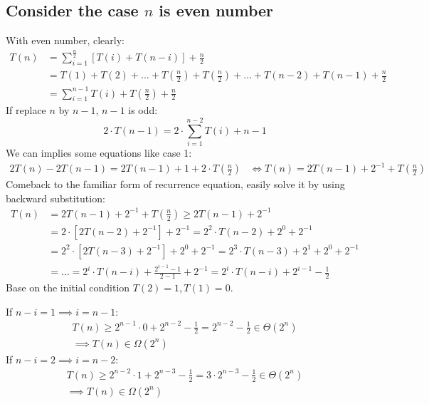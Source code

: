 \documentclass[a4paper]{article}
\begin{document}
\subsection{Consider the case $n$ is even number}
With even number, clearly:
\begin{equation*}
    \begin{aligned}
        T(n) &= \sum_{i=1}^{\frac{n}{2}}[T(i)+T(n-i)] + \frac{n}{2} \\
        &= T(1)+T(2)+\ldots+T(\frac{n}{2})+T(\frac{n}{2})+\ldots+T(n-2)+T(n-1) + \frac{n}{2} \\ 
        &= \sum_{i=1}^{n-1}T(i) + T(\frac{n}{2}) + \frac{n}{2} 
    \end{aligned}
\end{equation*}
If replace $n$ by $n-1$, $n-1$ is odd:
\begin{equation*}
    2 \cdot T(n-1) = 2 \cdot \sum_{i=1}^{n-2}{T(i)} + n-1 
\end{equation*}
We can implies some equations like case 1:
\begin{equation*}
    \begin{aligned}
        2T(n) - 2T(n-1) = 2T(n-1) + 1 +  2 \cdot T(\frac{n}{2})
        & \Leftrightarrow T(n) = 2T(n-1) + 2^{-1} + T(\frac{n}{2})
    \end{aligned}
\end{equation*}
Comeback to the familiar form of recurrence equation, easily solve it by using backward substitution: 
\begin{equation*}
    \begin{aligned}
        T(n)& = 2T(n-1) + 2^{-1} + T(\frac{n}{2}) \geq 2T(n-1) + 2^{-1} \\
        & = 2 \cdot [2T(n-2) + 2^{-1}] + 2^{-1} = 2^2 \cdot T(n-2) + 2^0 + 2^{-1} \\ 
        & = 2^2 \cdot[2T(n-3) + 2^{-1}] + 2^0 + 2^{-1}  = 2^3 \cdot T(n-3) + 2^1+2^0+2^{-1} \\
        & = \ldots = 2^i \cdot T(n-i) + \frac{2^{i-1}-1}{2-1} + 2^{-1} = 2^i \cdot T(n-i) + 2^{i-1} - \frac{1}{2}
    \end{aligned}
\end{equation*}
Base on the initial condition $T(2)=1, T(1)=0$. \par 
If $n-i=1 \implies i=n-1$:
\begin{equation*}
    \begin{aligned}
        T(n) \geq 2^{n-1} \cdot 0 + 2^{n-2} - \frac{1}{2} 
        = 2^{n-2} - \frac{1}{2} \in \Theta(2^n) \\
        \implies T(n) \in \Omega(2^n)
    \end{aligned}
\end{equation*}
If $n-i=2 \implies i=n-2$:
\begin{equation*}
    \begin{aligned}
        T(n) \geq 2^{n-2} \cdot 1 + 2^{n-3} - \frac{1}{2}
         = 3 \cdot 2^{n-3} - \frac{1}{2} \in \Theta(2^n) \\
         \implies T(n) \in \Omega(2^n)
    \end{aligned}
\end{equation*}
\newpage
\end{document}
